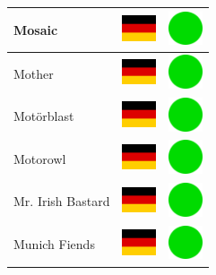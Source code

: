 \documentclass[12pt, a4paper, twoside]{report}
\begin{document}
\begin{center}
\begin{longtable}{|p{5cm}|p{2cm}|p{2cm}|}
 Mosaic                                                     & \includegraphics[width=1cm]{../4x3/de} &   \includegraphics[width=1cm]{../likes/y} \\ \hline
 Mother                                                     & \includegraphics[width=1cm]{../4x3/de} &   \includegraphics[width=1cm]{../likes/y} \\ \hline
 Motörblast                                                 & \includegraphics[width=1cm]{../4x3/de} &   \includegraphics[width=1cm]{../likes/y} \\ \hline
 Motorowl                                                   & \includegraphics[width=1cm]{../4x3/de} &   \includegraphics[width=1cm]{../likes/y} \\ \hline
 Mr. Irish Bastard                                          & \includegraphics[width=1cm]{../4x3/de} &   \includegraphics[width=1cm]{../likes/y} \\ \hline
 Munich Fiends                                              & \includegraphics[width=1cm]{../4x3/de} &   \includegraphics[width=1cm]{../likes/y} \\ \hline

\end{longtable}
\end{center}
\end{document}
